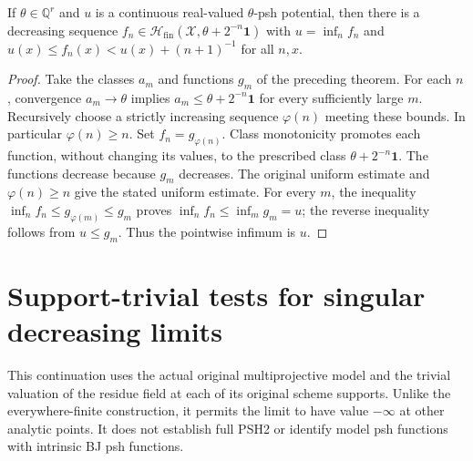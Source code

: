 \begin{corollary}
\label{cor:seven-continuous-dyadic-rational-fs}
\leanok
If $\theta\in\mathbb Q^r$ and $u$ is a continuous real-valued
$\theta$-psh potential, then there is a decreasing sequence
$f_n\in\mathcal H_{\mathrm{fin}}(\mathcal X,\theta+2^{-n}\mathbf1)$
with $u=\inf_n f_n$ and
$u(x)\le f_n(x)<u(x)+(n+1)^{-1}$ for all $n,x$.
\end{corollary}
\begin{proof}
Take the classes $a_m$ and functions $g_m$ of the preceding theorem.
For each $n$, convergence $a_m\to\theta$ implies
$a_m\le\theta+2^{-n}\mathbf1$ for every sufficiently large $m$.
Recursively choose a strictly increasing sequence $\varphi(n)$ meeting
these bounds. In particular $\varphi(n)\ge n$.
Set $f_n=g_{\varphi(n)}$. Class monotonicity promotes each function,
without changing its values, to the prescribed class
$\theta+2^{-n}\mathbf1$. The functions decrease because $g_m$ decreases.
The original uniform estimate and $\varphi(n)\ge n$ give the stated
uniform estimate. For every $m$, the inequality
$\inf_n f_n\le g_{\varphi(m)}\le g_m$ proves
$\inf_n f_n\le\inf_m g_m=u$; the reverse inequality follows from
$u\le g_m$. Thus the pointwise infimum is $u$.
\end{proof}

\section{Support-trivial tests for singular decreasing limits}

This continuation uses the actual original multiprojective model and the
trivial valuation of the residue field at each of its original scheme
supports. Unlike the everywhere-finite construction, it permits the limit
to have value $-\infty$ at other analytic points. It does not establish
full PSH2 or identify model psh functions with intrinsic BJ psh functions.

